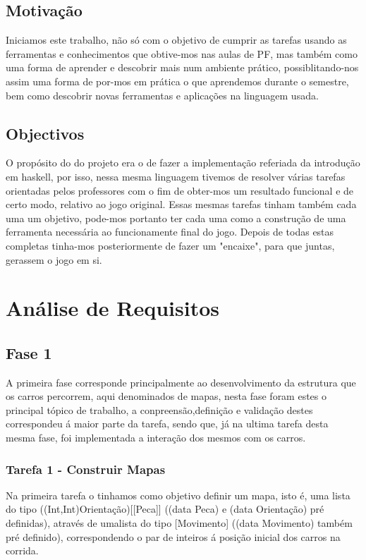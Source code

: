 \documentclass[a4paper]{report} %
\begin{document}
  \section{Motivação}
  Iniciamos este trabalho, não só com o objetivo de cumprir as tarefas usando as ferramentas e conhecimentos que obtive-mos nas aulas de PF, mas também como uma forma de aprender e descobrir mais num ambiente prático, possiblitando-nos assim uma forma de por-mos em prática o que aprendemos durante o semestre, bem como descobrir novas ferramentas e aplicações na linguagem usada.
  
  \section{Objectivos}
  O propósito do do projeto era o de fazer a implementação referiada da introdução em haskell, por isso, nessa mesma linguagem tivemos de resolver várias tarefas orientadas pelos professores com o fim de obter-mos um resultado funcional e de certo modo, relativo ao jogo original.
  Essas mesmas tarefas tinham também cada uma um objetivo, pode-mos portanto ter cada uma como a construção de uma ferramenta necessária ao funcionamente final do jogo. Depois de todas estas completas tinha-mos posteriormente de fazer um "encaixe", para que juntas, gerassem o jogo em si.

\chapter{Análise de Requisitos}


\section{Fase 1}
A primeira fase corresponde principalmente ao desenvolvimento da estrutura que os carros percorrem, aqui denominados de mapas, nesta fase 
foram estes o principal tópico de trabalho, a conpreensão,definição e validação destes correspondeu á maior parte da tarefa, sendo que, já na ultima tarefa desta mesma fase, foi implementada a interação dos mesmos com os carros.

\subsection{Tarefa 1 - Construir Mapas}
Na primeira tarefa o tinhamos como objetivo definir um mapa, isto é, uma lista do tipo ((Int,Int)Orientação)[[Peca]] ((data Peca) e (data Orientação) pré definidas), através de umalista do tipo [Movimento] ((data Movimento) também pré definido), correspondendo o par de inteiros á posição inicial dos carros na corrida.
\end{document}
